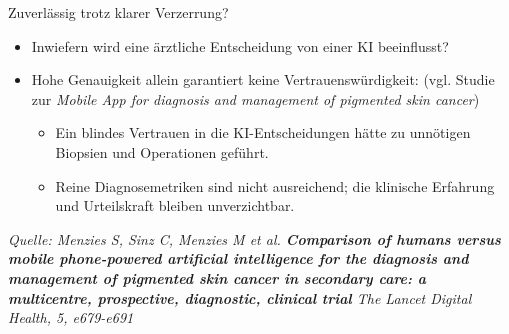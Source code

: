 \documentclass[aspectratio=169]{beamer}
\begin{document}
\begin{frame}{Zuverlässig trotz klarer Verzerrung?}
    \begin{itemize}
        \item Inwiefern wird eine ärztliche Entscheidung von einer KI beeinflusst?
        \item Hohe Genauigkeit allein garantiert keine Vertrauenswürdigkeit: (vgl. Studie zur \textit{Mobile App for diagnosis and management of pigmented skin cancer})
        \begin{itemize}
            \item Ein blindes Vertrauen in die KI-Entscheidungen hätte zu unnötigen Biopsien und Operationen geführt.
            \item Reine Diagnosemetriken sind nicht ausreichend; die klinische Erfahrung und Urteilskraft bleiben unverzichtbar.
        \end{itemize}
    \end{itemize}
    
    \vspace*{\fill}
    \tiny \textit{Quelle: Menzies S, Sinz C, Menzies M et al. \textbf{Comparison of humans versus mobile phone-powered artificial intelligence for the diagnosis and management of pigmented skin cancer in secondary care: a multicentre, prospective, diagnostic, clinical trial} The Lancet Digital Health, 5, e679-e691}
\end{frame}
\end{document}
